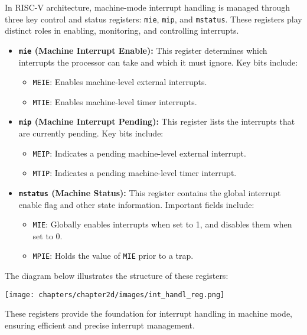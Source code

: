 In RISC-V architecture, machine-mode interrupt handling is managed through three key control and status registers: \texttt{mie}, \texttt{mip}, and \texttt{mstatus}. These registers play distinct roles in enabling, monitoring, and controlling interrupts.

\begin{itemize}
    \item \textbf{\texttt{mie} (Machine Interrupt Enable):}
    This register determines which interrupts the processor can take and which it must ignore. Key bits include:
    \begin{itemize}
        \item \texttt{MEIE}: Enables machine-level external interrupts.
        \item \texttt{MTIE}: Enables machine-level timer interrupts.
    \end{itemize}

    \item \textbf{\texttt{mip} (Machine Interrupt Pending):}
    This register lists the interrupts that are currently pending. Key bits include:
    \begin{itemize}
        \item \texttt{MEIP}: Indicates a pending machine-level external interrupt.
        \item \texttt{MTIP}: Indicates a pending machine-level timer interrupt.
    \end{itemize}

    \item \textbf{\texttt{mstatus} (Machine Status):}
    This register contains the global interrupt enable flag and other state information. Important fields include:
    \begin{itemize}
        \item \texttt{MIE}: Globally enables interrupts when set to 1, and disables them when set to 0.
        \item \texttt{MPIE}: Holds the value of \texttt{MIE} prior to a trap.
    \end{itemize}
\end{itemize}

The diagram below illustrates the structure of these registers:
\begin{center}
    \texttt{[image: chapters/chapter2d/images/int\_handl\_reg.png]}
\end{center}

These registers provide the foundation for interrupt handling in machine mode, ensuring efficient and precise interrupt management.

